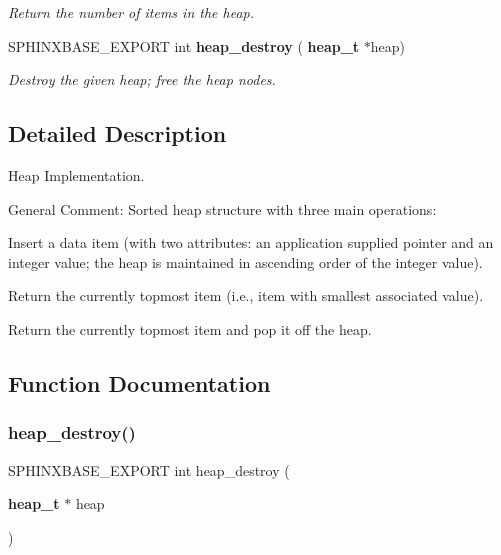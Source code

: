 \begin{DoxyCompactItemize}
\begin{DoxyCompactList}\small\item\em Return the number of items in the heap. \end{DoxyCompactList}\item 
S\+P\+H\+I\+N\+X\+B\+A\+S\+E\+\_\+\+E\+X\+P\+O\+RT int \textbf{ heap\+\_\+destroy} (\textbf{ heap\+\_\+t} $\ast$heap)
\begin{DoxyCompactList}\small\item\em Destroy the given heap; free the heap nodes. \end{DoxyCompactList}\end{DoxyCompactItemize}


\subsection{Detailed Description}
Heap Implementation. 

General Comment\+: Sorted heap structure with three main operations\+:


\begin{DoxyEnumerate}
\item Insert a data item (with two attributes\+: an application supplied pointer and an integer value; the heap is maintained in ascending order of the integer value).
\item Return the currently topmost item (i.\+e., item with smallest associated value).
\item Return the currently topmost item and pop it off the heap. 
\end{DoxyEnumerate}

\subsection{Function Documentation}
\mbox{\label{heap_8h_ab12b1efd6392eb574d2da9c981e7320c}} 
\subsubsection{heap\+\_\+destroy()}
{\footnotesize\ttfamily S\+P\+H\+I\+N\+X\+B\+A\+S\+E\+\_\+\+E\+X\+P\+O\+RT int heap\+\_\+destroy (\begin{DoxyParamCaption}\item[{\textbf{ heap\+\_\+t} $\ast$}]{heap }\end{DoxyParamCaption})}



